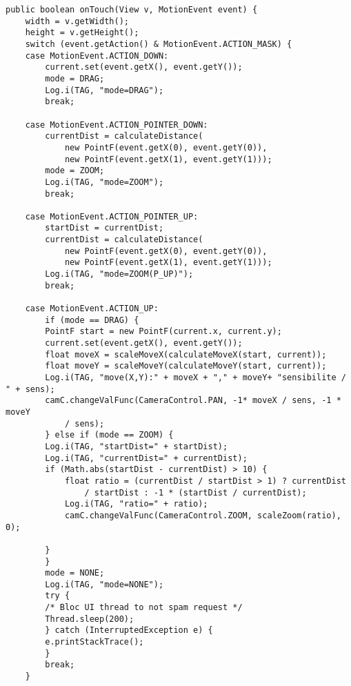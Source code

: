 \begin{lstlisting}
public boolean onTouch(View v, MotionEvent event) {
	width = v.getWidth();
	height = v.getHeight();
	switch (event.getAction() & MotionEvent.ACTION_MASK) {
	case MotionEvent.ACTION_DOWN:
	    current.set(event.getX(), event.getY());
	    mode = DRAG;
	    Log.i(TAG, "mode=DRAG");
	    break;

	case MotionEvent.ACTION_POINTER_DOWN:
	    currentDist = calculateDistance(
		    new PointF(event.getX(0), event.getY(0)),
		    new PointF(event.getX(1), event.getY(1)));
	    mode = ZOOM;
	    Log.i(TAG, "mode=ZOOM");
	    break;

	case MotionEvent.ACTION_POINTER_UP:
	    startDist = currentDist;
	    currentDist = calculateDistance(
		    new PointF(event.getX(0), event.getY(0)),
		    new PointF(event.getX(1), event.getY(1)));
	    Log.i(TAG, "mode=ZOOM(P_UP)");
	    break;

	case MotionEvent.ACTION_UP:
	    if (mode == DRAG) {
		PointF start = new PointF(current.x, current.y);
		current.set(event.getX(), event.getY());
		float moveX = scaleMoveX(calculateMoveX(start, current));
		float moveY = scaleMoveY(calculateMoveY(start, current));
		Log.i(TAG, "move(X,Y):" + moveX + "," + moveY+ "sensibilite / " + sens);
		camC.changeValFunc(CameraControl.PAN, -1* moveX / sens, -1 * moveY
			/ sens);
	    } else if (mode == ZOOM) {
		Log.i(TAG, "startDist=" + startDist);
		Log.i(TAG, "currentDist=" + currentDist);
		if (Math.abs(startDist - currentDist) > 10) {
		    float ratio = (currentDist / startDist > 1) ? currentDist
			    / startDist : -1 * (startDist / currentDist);
		    Log.i(TAG, "ratio=" + ratio);
		    camC.changeValFunc(CameraControl.ZOOM, scaleZoom(ratio), 0);

		}
	    }
	    mode = NONE;
	    Log.i(TAG, "mode=NONE");
	    try {
		/* Bloc UI thread to not spam request */
		Thread.sleep(200);
	    } catch (InterruptedException e) {
		e.printStackTrace();
	    }
	    break;
	}
\end{lstlisting}